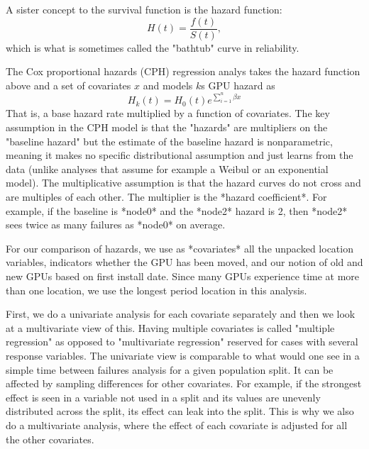 A sister concept to the survival function is the hazard function:
\begin{displaymath}
  H(t) = \frac{f(t)}{S(t)},
\end{displaymath}
which is what is sometimes called the "bathtub" curve in reliability.


The Cox proportional hazards (CPH) regression analys
\cite{Cox1972,Harrell2015} takes the hazard function above and a set
of covariates $x$ and models $k$s GPU hazard as 
\begin{displaymath}
  H_k(t) = H_0(t)e^{\sum\limits_{i=1}^n{\beta x}}
\end{displaymath}
That is, a base hazard rate multiplied by a function of
covariates. The key assumption in the CPH model is that the "hazards"
are multipliers on the "baseline hazard" but the estimate of the
baseline hazard is nonparametric, meaning it makes no specific
distributional assumption and just learns from the data (unlike
analyses that assume for example a Weibul or an exponential
model). The multiplicative assumption is that the hazard curves do not
cross and are multiples of each other. The multiplier is the *hazard
coefficient*. For example, if the baseline is *node0* and the *node2*
hazard is 2, then *node2* sees twice as many failures as *node0* on
average. 

For our comparison of hazards, we use as *covariates* all the unpacked
location variables, indicators whether the GPU has been moved, and our
notion of old and new GPUs based on first install date. Since many
GPUs experience time at more than one location, we use the longest
period location in this analysis. 

First, we do a univariate analysis for each covariate separately and
then we look at a multivariate view of this. Having multiple
covariates is called "multiple regression" as opposed to "multivariate
regression" reserved for cases with several response variables. The
univariate view is comparable to what would one see in a simple time
between failures analysis for a given population split. It can be
affected by sampling differences for other covariates. For example, if
the strongest effect is seen in a variable not used in a split and its
values are unevenly distributed across the split, its effect can leak
into the split. This is why we also do a multivariate analysis, where
the effect of each covariate is adjusted for all the other
covariates. 
 

